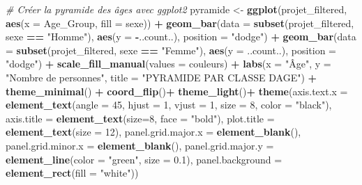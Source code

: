 \documentclass[
]{article}
\newenvironment{Shaded}{\begin{snugshade}}{\end{snugshade}}
\newcommand{\AttributeTok}[1]{\textcolor[rgb]{0.13,0.29,0.53}{#1}}
\newcommand{\CommentTok}[1]{\textcolor[rgb]{0.56,0.35,0.01}{\textit{#1}}}
\newcommand{\DecValTok}[1]{\textcolor[rgb]{0.00,0.00,0.81}{#1}}
\newcommand{\FloatTok}[1]{\textcolor[rgb]{0.00,0.00,0.81}{#1}}
\newcommand{\FunctionTok}[1]{\textcolor[rgb]{0.13,0.29,0.53}{\textbf{#1}}}
\newcommand{\NormalTok}[1]{#1}
\newcommand{\OtherTok}[1]{\textcolor[rgb]{0.56,0.35,0.01}{#1}}
\newcommand{\SpecialCharTok}[1]{\textcolor[rgb]{0.81,0.36,0.00}{\textbf{#1}}}
\newcommand{\StringTok}[1]{\textcolor[rgb]{0.31,0.60,0.02}{#1}}
\begin{document}
\begin{Shaded}
\begin{Highlighting}[]
\CommentTok{\# Créer la pyramide des âges avec ggplot2}
\NormalTok{pyramide }\OtherTok{\textless{}{-}} \FunctionTok{ggplot}\NormalTok{(projet\_filtered, }\FunctionTok{aes}\NormalTok{(}\AttributeTok{x =}\NormalTok{ Age\_Group, }\AttributeTok{fill =}\NormalTok{ sexe)) }\SpecialCharTok{+}
  \FunctionTok{geom\_bar}\NormalTok{(}\AttributeTok{data =} \FunctionTok{subset}\NormalTok{(projet\_filtered, sexe }\SpecialCharTok{==} \StringTok{"Homme"}\NormalTok{), }
           \FunctionTok{aes}\NormalTok{(}\AttributeTok{y =} \SpecialCharTok{{-}}\NormalTok{..count..),  }\AttributeTok{position =} \StringTok{"dodge"}\NormalTok{) }\SpecialCharTok{+}
  \FunctionTok{geom\_bar}\NormalTok{(}\AttributeTok{data =} \FunctionTok{subset}\NormalTok{(projet\_filtered, sexe }\SpecialCharTok{==} \StringTok{"Femme"}\NormalTok{), }
           \FunctionTok{aes}\NormalTok{(}\AttributeTok{y =}\NormalTok{ ..count..),  }\AttributeTok{position =} \StringTok{"dodge"}\NormalTok{) }\SpecialCharTok{+}
  \FunctionTok{scale\_fill\_manual}\NormalTok{(}\AttributeTok{values =}\NormalTok{ couleurs) }\SpecialCharTok{+}
  \FunctionTok{labs}\NormalTok{(}\AttributeTok{x =} \StringTok{"Âge"}\NormalTok{, }\AttributeTok{y =} \StringTok{"Nombre de personnes"}\NormalTok{, }
       \AttributeTok{title =} \StringTok{"PYRAMIDE PAR CLASSE D\textquotesingle{}AGE"}\NormalTok{) }\SpecialCharTok{+}
  \FunctionTok{theme\_minimal}\NormalTok{() }\SpecialCharTok{+}
  \FunctionTok{coord\_flip}\NormalTok{()}\SpecialCharTok{+}
  \FunctionTok{theme\_light}\NormalTok{()}\SpecialCharTok{+}
  \FunctionTok{theme}\NormalTok{(}\AttributeTok{axis.text.x =} \FunctionTok{element\_text}\NormalTok{(}\AttributeTok{angle =} \DecValTok{45}\NormalTok{, }\AttributeTok{hjust =} \DecValTok{1}\NormalTok{, }
                                   \AttributeTok{vjust =} \DecValTok{1}\NormalTok{, }\AttributeTok{size =} \DecValTok{8}\NormalTok{, }\AttributeTok{color =} \StringTok{"black"}\NormalTok{),}
        \AttributeTok{axis.title =} \FunctionTok{element\_text}\NormalTok{(}\AttributeTok{size=}\DecValTok{8}\NormalTok{, }\AttributeTok{face =} \StringTok{"bold"}\NormalTok{),}
        \AttributeTok{plot.title =} \FunctionTok{element\_text}\NormalTok{(}\AttributeTok{size =} \DecValTok{12}\NormalTok{),}
        \AttributeTok{panel.grid.major.x =} \FunctionTok{element\_blank}\NormalTok{(),}
        \AttributeTok{panel.grid.minor.x =} \FunctionTok{element\_blank}\NormalTok{(),}
        \AttributeTok{panel.grid.major.y =} \FunctionTok{element\_line}\NormalTok{(}\AttributeTok{color =} \StringTok{"green"}\NormalTok{, }\AttributeTok{size =} \FloatTok{0.1}\NormalTok{),}
        \AttributeTok{panel.background =} \FunctionTok{element\_rect}\NormalTok{(}\AttributeTok{fill =} \StringTok{"white"}\NormalTok{))}



\end{Highlighting}
\end{Shaded}
\end{document}
